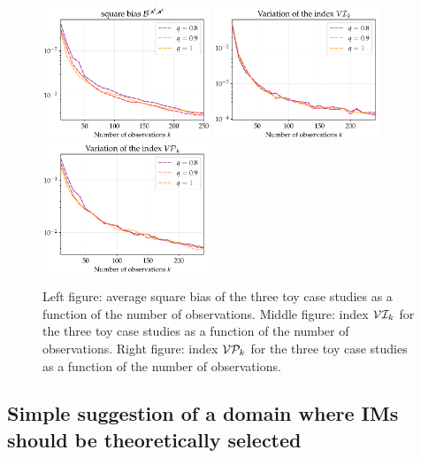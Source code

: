     \begin{figure}[h]
        \centering%
        \includegraphics[width=5cm]{figures/DoE/toy_bias_log.pdf}%
        \includegraphics[width=5cm]{figures/DoE/toyVI.pdf}%
        \includegraphics[width=5cm]{figures/DoE/toyVP.pdf}%
        \caption{Left figure: average square bias of the three toy case studies as a function of the number of observations. Middle figure: index $\mathcal{V}\mathcal{I}_k$ for the three toy case studies as a function of the number of observations. Right figure: index $\mathcal{V}\mathcal{P}_k$ for the three toy case studies as a function of the number of observations.}
        \label{fig:metrics-toy}
    \end{figure}
    
    
    
    \subsection{Simple suggestion of a domain where IMs should be theoretically selected}\label{sec:au-maths-calc}
    
    
    
